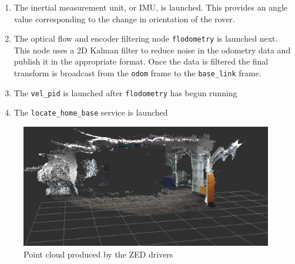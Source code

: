 \documentclass[10pt, oneside,onecolumn]{IEEEtran}
\begin{document}
\begin{titlepage}
\begin{enumerate}
\item The inertial measurement unit, or IMU, is launched. This provides an angle value corresponding to the change in orientation of the rover. 

\item The optical flow and encoder filtering node \texttt{flodometry} is launched next. This node uses a 2D Kalman filter to reduce noise in the odometry data and publish it in the appropriate format. Once the data is filtered the final transform is broadcast from the \texttt{odom} frame to the \texttt{base\_link} frame.
\item The \texttt{vel\_pid} is launched after \texttt{flodometry} has begun running
\item The \texttt{locate\_home\_base} service is launched

\end{enumerate}

\begin{figure}[H]
\centering
\includegraphics[width=110mm]{newpc2.eps}
\caption{Point cloud produced by the ZED drivers \label{overflow}}
\end{figure}


\end{titlepage}
\end{document}
